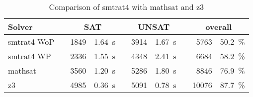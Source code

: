\begin{table}[!ht]
    \caption{Comparison of smtrat4 with mathsat and z3}    
    \begin{tabularx}{\textwidth}{lXrrXrrXrr}
	\toprule
	\textbf{Solver}
	&& \multicolumn{2}{c}{\textbf{SAT}}
	&& \multicolumn{2}{c}{\textbf{UNSAT}}
	&& \multicolumn{2}{c}{\textbf{overall}}
	\\
	\midrule
	smtrat4 WoP
	&& 1849 & 1.64~s
	&& 3914 & 1.67~s
	&& 5763 & 50.2~\%
	\\
	smtrat4 WP
	&& 2336 & 1.55~s
	&& 4348 & 2.41~s
	&& 6684 & 58.2~\%
	\\
	mathsat
    	&& 3560 & 1.20~s
     	&& 5286 & 1.80~s
     	&& 8846 & 76.9~\%
	\\
	z3
	&& 4985 & 0.36~s
	&& 5091 & 0.78~s
	&& 10076 & 87.7~\%
	\\
	\bottomrule
\end{tabularx}
    \label{table:smtrat4_vs_mathsatAndZ3}
\end{table}

